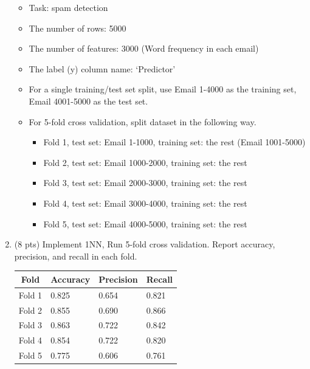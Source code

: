 \documentclass[a4paper]{article}
\theoremstyle{definition}
\newenvironment{soln}{
    \leavevmode\color{blue}\ignorespaces
}{}
\begin{document}
\begin{enumerate}
	\begin{itemize}
		\item Task: spam detection
		\item The number of rows: 5000
		\item The number of features: 3000 (Word frequency in each email)
		\item The label (y) column name: `Predictor'
		\item For a single training/test set split, use Email 1-4000 as the training set, Email 4001-5000 as the test set.
		\item For 5-fold cross validation, split dataset in the following way.
		\begin{itemize}
			\item Fold 1, test set: Email 1-1000, training set: the rest (Email 1001-5000)
			\item Fold 2, test set: Email 1000-2000, training set: the rest
			\item Fold 3, test set: Email 2000-3000, training set: the rest
			\item Fold 4, test set: Email 3000-4000, training set: the rest
			\item Fold 5, test set: Email 4000-5000, training set: the rest			
		\end{itemize}
	\end{itemize}
	
	\item (8 pts) Implement 1NN, Run 5-fold cross validation. Report accuracy, precision, and recall in each fold.
	
	\begin{soln} 
		\begin{table}[H]
			\centering
			\begin{tabular}{|l|l|l|l|}
			\hline
			\multicolumn{1}{|c|}{\textbf{Fold}} & \multicolumn{1}{c|}{\textbf{Accuracy}} & \multicolumn{1}{c|}{\textbf{Precision}} & \multicolumn{1}{c|}{\textbf{Recall}} \\ \hline
			Fold 1                              & 0.825                                  & 0.654                                   & 0.821                                \\ \hline
			Fold 2                              & 0.855                                  & 0.690                                   & 0.866                                \\ \hline
			Fold 3                              & 0.863                                  & 0.722                                   & 0.842                                \\ \hline
			Fold 4                              & 0.854                                  & 0.722                                   & 0.820                                \\ \hline
			Fold 5                              & 0.775                                  & 0.606                                   & 0.761                                \\ \hline
			\end{tabular}
			\end{table}
	\end{soln}
	

\end{enumerate}
\end{document}
